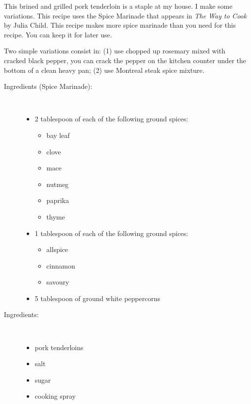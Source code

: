 \documentclass[11pt,letterpaper]{article}
\begin{document}


 
This brined and grilled pork tenderloin is a staple at my house. I make some variations. This recipe uses the Spice Marinade that appears in {\it The Way to Cook} by Julia Child. This  recipe makes more spice marinade than you need for this recipe. You can keep it for later use.
 
Two simple variations consist in: 
(1) use chopped up rosemary mixed with cracked black pepper, you can crack the pepper on the kitchen counter under the bottom of a clean heavy pan; 
(2) use Montreal steak spice mixture.
 
\begin{description}

\item[Ingredients (Spice Marinade):]\ \\
	\begin{itemize}
	\item 2 tablespoon of each of the following ground spices:
		\begin{itemize}
		\item bay leaf
		\item clove
		\item mace
		\item nutmeg
		\item paprika
		\item thyme
		\end{itemize}
	\item 1 tablespoon of each of the following ground spices:
		\begin{itemize}
		\item allspice
		\item cinnamon
		\item savoury
		\end{itemize}
	\item 5 tablespoon of ground white peppercorns
	\end{itemize}

\item[Ingredients:]\ \\
	\begin{itemize}
	\item pork tenderloins
	\item salt
	\item sugar
	\item cooking spray
	\end{itemize}


\end{description}
\end{document}
